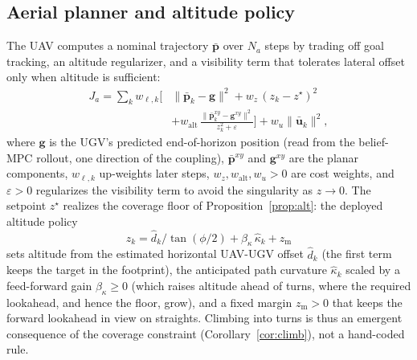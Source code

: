 \documentclass{ifacconf}
\begin{document}
\subsection{Aerial planner and altitude policy}
\label{sec:aerial}
The UAV computes a nominal trajectory $\bar{\mathbf{p}}$ over $N_a$ steps by trading off goal tracking,
an altitude regularizer, and a visibility term that tolerates lateral offset only when altitude is
sufficient:
\begin{equation}
\begin{split}
J_a=\sum_k w_{\ell,k}\Big[&\lVert\bar{\mathbf{p}}_k-\mathbf{g}\rVert^2+w_z\,(z_k-z^\star)^2\\
&+w_{\mathrm{alt}}\,\frac{\lVert\bar{\mathbf{p}}^{xy}_k-\mathbf{g}^{xy}\rVert^2}{z_k^2+\varepsilon}\Big]
+w_u\lVert\bar{\mathbf{u}}_k\rVert^2,
\end{split}
\label{eq:Ja}
\end{equation}
where $\mathbf{g}$ is the UGV's predicted end-of-horizon position (read from the belief-MPC rollout,
one direction of the coupling), $\bar{\mathbf{p}}^{xy}$ and $\mathbf{g}^{xy}$ are the planar
components, $w_{\ell,k}$ up-weights later steps, $w_z,w_{\mathrm{alt}},w_u>0$ are cost weights, and
$\varepsilon>0$ regularizes the visibility term to avoid the singularity as $z\to0$. The setpoint
$z^\star$ realizes the coverage floor of Proposition~\ref{prop:alt}: the deployed altitude policy
\begin{equation}
z_k=\hat d_k/\tan(\phi/2)+\beta_\kappa\,\hat\kappa_k+z_{\mathrm{m}}
\label{eq:altpol}
\end{equation}
sets altitude from the estimated horizontal UAV-UGV offset $\hat d_k$ (the first term keeps the target
in the footprint), the anticipated path curvature $\hat\kappa_k$ scaled by a feed-forward gain
$\beta_\kappa\ge0$ (which raises altitude ahead of turns, where the required lookahead, and hence the
floor, grow), and a fixed margin $z_{\mathrm{m}}>0$ that keeps the forward lookahead in view on
straights. Climbing into turns is thus an emergent consequence of the coverage constraint
(Corollary~\ref{cor:climb}), not a hand-coded rule.
\end{document}
